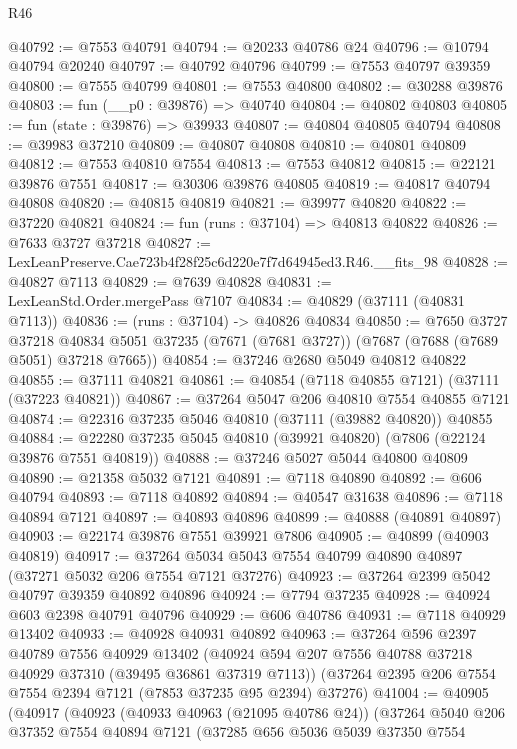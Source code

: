 \begin{lexlean}{R46}
\begin{coremodule}
@40792 := @7553 @40791
@40794 := @20233 @40786 @24
@40796 := @10794 @40794 @20240
@40797 := @40792 @40796
@40799 := @7553 @40797 @39359
@40800 := @7555 @40799
@40801 := @7553 @40800
@40802 := @30288 @39876
@40803 := fun (__p0 : @39876) => @40740
@40804 := @40802 @40803
@40805 := fun (state : @39876) => @39933
@40807 := @40804 @40805 @40794
@40808 := @39983 @37210
@40809 := @40807 @40808
@40810 := @40801 @40809
@40812 := @7553 @40810 @7554
@40813 := @7553 @40812
@40815 := @22121 @39876 @7551
@40817 := @30306 @39876 @40805
@40819 := @40817 @40794 @40808
@40820 := @40815 @40819
@40821 := @39977 @40820
@40822 := @37220 @40821
@40824 := fun (runs : @37104) => @40813 @40822
@40826 := @7633 @3727 @37218
@40827 := LexLeanPreserve.Cae723b4f28f25c6d220e7f7d64945ed3.R46.__fits_98
@40828 := @40827 @7113
@40829 := @7639 @40828
@40831 := LexLeanStd.Order.mergePass @7107
@40834 := @40829 (@37111 (@40831 @7113))
@40836 := (runs : @37104) -> @40826 @40834
@40850 := @7650
    @3727
    @37218
    @40834
    @5051
    @37235
    (@7671 (@7681 @3727))
    (@7687 (@7688 (@7689 @5051) @37218 @7665))
@40854 := @37246 @2680 @5049 @40812 @40822
@40855 := @37111 @40821
@40861 := @40854 (@7118 @40855 @7121) (@37111 (@37223 @40821))
@40867 := @37264 @5047 @206 @40810 @7554 @40855 @7121
@40874 := @22316 @37235 @5046 @40810 (@37111 (@39882 @40820)) @40855
@40884 := @22280 @37235 @5045 @40810 (@39921 @40820) (@7806 (@22124 @39876 @7551 @40819))
@40888 := @37246 @5027 @5044 @40800 @40809
@40890 := @21358 @5032 @7121
@40891 := @7118 @40890
@40892 := @606 @40794
@40893 := @7118 @40892
@40894 := @40547 @31638
@40896 := @7118 @40894 @7121
@40897 := @40893 @40896
@40899 := @40888 (@40891 @40897)
@40903 := @22174 @39876 @7551 @39921 @7806
@40905 := @40899 (@40903 @40819)
@40917 := @37264 @5034 @5043 @7554 @40799 @40890 @40897 (@37271 @5032 @206 @7554 @7121 @37276)
@40923 := @37264 @2399 @5042 @40797 @39359 @40892 @40896
@40924 := @7794 @37235
@40928 := @40924 @603 @2398 @40791 @40796
@40929 := @606 @40786
@40931 := @7118 @40929 @13402
@40933 := @40928 @40931 @40892
@40963 := @37264
    @596
    @2397
    @40789
    @7556
    @40929
    @13402
    (@40924 @594 @207 @7556 @40788 @37218 @40929 @37310 (@39495 @36861 @37319 @7113))
    (@37264 @2395 @206 @7554 @7554 @2394 @7121 (@7853 @37235 @95 @2394) @37276)
@41004 := @40905
    (@40917
      (@40923
        (@40933 @40963 (@21095 @40786 @24))
        (@37264
          @5040
          @206
          @37352
          @7554
          @40894
          @7121
          (@37285
            @656
            @5036
            @5039
            @37350
            @7554

\end{coremodule}
\end{lexlean}
